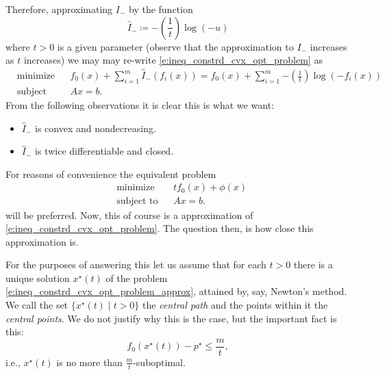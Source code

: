 \documentclass[11pt]{amsart}
\theoremstyle{definition}
\theoremstyle{remark}
\begin{document}
        Therefore, approximating $I_{-}$ by the function
        \begin{equation}
            \widehat{I}_{-} \coloneqq -\left(\frac{1}{t}\right)\log(-u)
        \end{equation}
        where $t > 0$ is a given parameter (observe that the approximation to $I_{-}$ increases as $t$ increases) we may may re-write \eqref{e:ineq_constrd_cvx_opt_problem} as
        \begin{equation}\label{e:ineq_constrd_cvx_opt_problem_approx_equiv}
            \begin{aligned}
            & {\text{minimize}} && f_0(x) + \sum_{i=1}^{m}{\widehat{I}_{-}(f_i(x))} =
            f_0(x) + \sum_{i=1}^{m}{-\left(\frac{1}{t}\right)\log(-f_i(x))}  \\
            & \text{subject to} && Ax = b.
            \end{aligned}
        \end{equation}
        From the following observations it is clear this is what we want:
        \begin{itemize}
            \item $\widehat{I}_{-}$ is convex and nondecreasing.
            \item $\widehat{I}_{-}$ is twice differentiable and closed.
         \end{itemize} 
        For reasons of convenience the equivalent problem
        \begin{equation}\label{e:ineq_constrd_cvx_opt_problem_approx}
            \begin{aligned}
            & {\text{minimize}} && 
            tf_0(x) + \phi(x)  \\
            & \text{subject to} && Ax = b.
            \end{aligned}
        \end{equation}
        will be preferred. Now, this of course is a approximation of \eqref{e:ineq_constrd_cvx_opt_problem}. The question then, is how close this approximation is.  

        For the purposes of answering this let us assume that for each $t>0$ there is a unique solution $x^\star(t)$ of the problem \eqref{e:ineq_constrd_cvx_opt_problem_approx}, attained by, say, Newton's method. We call the set $\{x^\star(t) \;|\; t>0 \}$ the \emph{central path} and the points within it the \emph{central points}. We do not justify why this is the case, but the important fact is this:
        \begin{equation*}
            f_0(x^\star(t)) - p^\star \leq \frac{m}{t},
        \end{equation*}
        i.e., $x^\star(t)$ is no more than $\frac{m}{t}$-suboptimal.
\end{document}
